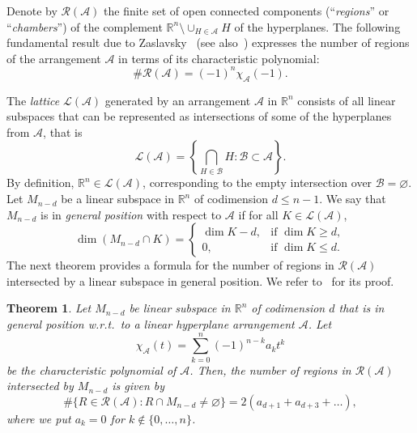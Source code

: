 \documentclass[12pt, reqno]{amsart}
\theoremstyle{plain}
\newtheorem{theorem}{Theorem}[section]
\theoremstyle{definition}
\theoremstyle{remark}
\begin{document}
Denote by ${\mathcal{R}}({\mathcal{A}})$  the finite set of open connected components (``\emph{regions}'' or ``\emph{chambers}'') of the complement ${\mathbb{R}}^n\setminus\cup_{H\in{\mathcal{A}}} H$ of the hyperplanes. 
The following fundamental result due to Zaslavsky~\cite{tZ75} (see also~\cite[Theorem~2.5]{rS07}) expresses the number of regions of the arrangement ${\mathcal{A}}$ in terms of its characteristic polynomial:
\begin{equation}\label{1112}
\# {\mathcal{R}}({\mathcal{A}})=(-1)^n\chi_{\mathcal{A}}(-1).
\end{equation}

The \emph{lattice} ${\mathcal{L}}({\mathcal{A}})$ generated by an arrangement ${\mathcal{A}}$ in ${\mathbb{R}}^n$ consists of all linear subspaces that can be represented as intersections of some of the hyperplanes from ${\mathcal{A}}$, that is
$$
{\mathcal{L}}({\mathcal{A}}) = \left\{\bigcap_{H\in{\mathcal{B}}}H \colon {\mathcal{B}} \subset {\mathcal{A}}\right\}.
$$
By definition, ${\mathbb{R}}^n\in {\mathcal{L}}({\mathcal{A}})$, corresponding to the empty intersection over ${\mathcal{B}}=\varnothing$. Let $M_{n-d}$ be a linear subspace in ${\mathbb{R}}^n$ of codimension $d\leq n-1$. We say that $M_{n-d}$ is in \emph{general position} with respect to ${\mathcal{A}}$ if for all $K\in {\mathcal{L}}({\mathcal{A}})$,
\begin{equation}\label{1222}
\dim (M_{n-d}\cap K) =
\begin{cases}
\dim K -  d, &\text{if } \dim K \geq d,\\
0, &\text{if } \dim K \leq d.
\end{cases}
\end{equation}
The next theorem provides a formula for the number of regions in ${\mathcal{R}}({\mathcal{A}})$ intersected by a linear subspace in general position. We refer to~\cite{KVZ15} for its proof.
\begin{theorem}\label{1229}
Let $M_{n-d}$ be linear subspace in ${\mathbb{R}}^n$ of codimension $d$ that is in general position w.r.t.\ to a linear hyperplane arrangement ${\mathcal{A}}$. Let
\begin{equation}\label{eq:chi_def}
\chi_{\mathcal{A}}(t)=\sum_{k=0}^n (-1)^{n-k} a_kt^k
\end{equation}
be the characteristic polynomial of ${\mathcal{A}}$. Then, the number of regions in ${\mathcal{R}}({\mathcal{A}})$ intersected by $M_{n-d}$ is given by
$$
\#\{R\in {\mathcal{R}}({\mathcal{A}})\colon R\cap M_{n-d}\ne\varnothing\}
=
2(a_{d+1} + a_{d+3} +\ldots),
$$
where we put $a_k=0$ for $k\notin\{0,\ldots,n\}$.
\end{theorem}
\end{document}
